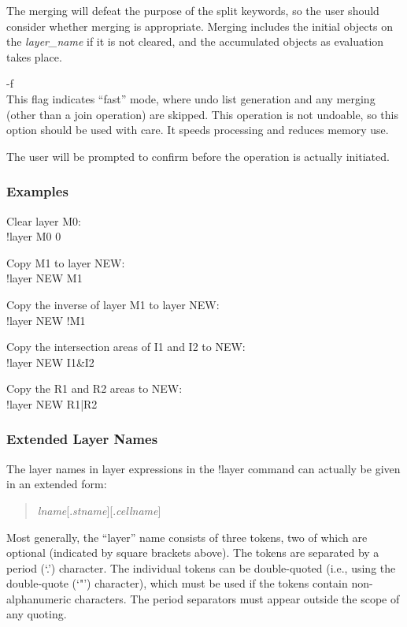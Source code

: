 \begin{description}
The merging will defeat the purpose of the split keywords, so the user
should consider whether merging is appropriate.  Merging includes the
initial objects on the {\it layer\_name} if it is not cleared, and the
accumulated objects as evaluation takes place.

\item{\vt -f}\\
This flag indicates ``fast'' mode, where undo list generation and any
merging (other than a join operation) are skipped.  This operation is
not undoable, so this option should be used with care.  It speeds
processing and reduces memory use.

The user will be prompted to confirm before the operation is actually
initiated.
\end{description}

\subsubsection{Examples}

\begin{description}
\item{Clear layer M0:}\\
{\vt !layer M0 0}
\item{Copy M1 to layer NEW:}\\
{\vt !layer NEW M1}
\item{Copy the inverse of layer M1 to layer NEW:}\\
{\vt !layer NEW !M1}
\item{Copy the intersection areas of I1 and I2 to NEW:}\\
{\vt !layer NEW I1\&I2}
\item{Copy the R1 and R2 areas to NEW:}\\
{\vt !layer NEW R1|R2}
\end{description}

\subsubsection{Extended Layer Names}
The layer names in layer expressions in the {\cb !layer} command can
actually be given in an extended form:

\begin{quote}
{\it lname\/}[{\vt .}{\it stname\/}][{\vt .}{\it cellname\/}]
\end{quote}

Most generally, the ``layer'' name consists of three tokens, two of
which are optional (indicated by square brackets above).  The tokens
are separated by a period (`{\vt .}') character.  The individual
tokens can be double-quoted (i.e., using the double-quote (`{\vt "}')
character), which must be used if the tokens contain non-alphanumeric
characters.  The period separators must appear outside the scope of
any quoting.

